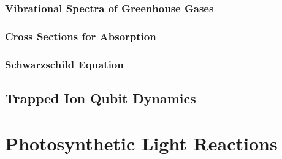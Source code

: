 \documentclass[9pt]{report}
\begin{document}
\subsection{Vibrational Spectra of Greenhouse Gases}

\subsection{Cross Sections for Absorption}

\subsection{Schwarzschild Equation}





\section{Trapped Ion Qubit Dynamics}




































\newpage
\chapter{Photosynthetic Light Reactions}
\end{document}
